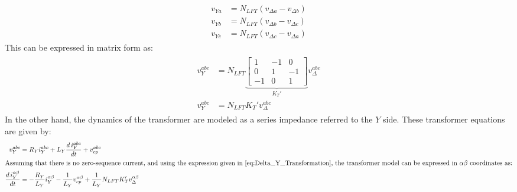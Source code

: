 \begin{align}
    \begin{aligned}
        v_{Ya} &= N_{LFT}(v_{\Delta a} - v_{\Delta b}) \\
        v_{Yb} &= N_{LFT}(v_{\Delta b} - v_{\Delta c}) \\
        v_{Yc} &= N_{LFT}(v_{\Delta c} - v_{\Delta a})
    \end{aligned}
\end{align}
This can be expressed in matrix form as:
\begin{align}
    \begin{aligned}
        v_Y^{abc} &= N_{LFT}
        \underbrace{
        \begin{bmatrix}
            1 & -1 & 0 \\
            0 & 1 & -1 \\
            -1 & 0 & 1
        \end{bmatrix}
        }_{K_T'}
        v_{\Delta}^{abc}\\
        v_Y^{abc} &= N_{LFT} K_T' v_{\Delta}^{abc} \label{eq:Delta_Y_Transformation}
    \end{aligned}
\end{align}
In the other hand, the dynamics of the transformer are modeled as a series impedance referred to the $Y$ side. These transformer equations are given by:
\begin{align}
    v_{Y}^{abc} &= R_Yi_Y^{abc} + L_Y\dfrac{d\,i_Y^{abc}}{dt} + v_{cp}^{abc} \\
    \intertext{Assuming that there is no zero-sequence current, and using the expression given in \eqref{eq:Delta_Y_Transformation}, the transformer model can be expressed in $\alpha\beta$ coordinates as:}
    \dfrac{d\,i_Y^{\alpha\beta}}{dt} &= -\dfrac{R_Y}{L_Y}i_Y^{\alpha\beta} - \dfrac{1}{L_Y}v_{cp}^{\alpha\beta} + \dfrac{1}{L_Y}N_{LFT}K_T'v_{\Delta}^{\alpha\beta}
\end{align}


